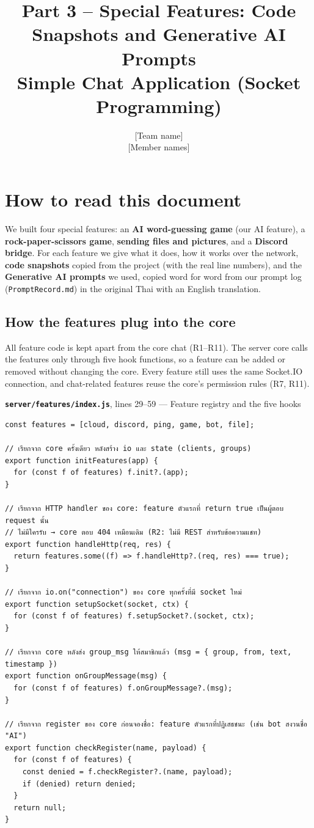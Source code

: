 \documentclass[11pt,a4paper]{article}
\title{\textbf{Part 3 -- Special Features: Code Snapshots and Generative AI Prompts}\\[2pt]
\large Simple Chat Application (Socket Programming)}
\author{{[Team name]} \\ {[Member names]}}
\date{}
\newcommand{\code}[1]{\texttt{#1}}
\newcommand{\snap}[3]{\par\medskip\textbf{\code{#1}}, lines #2 --- #3}
\begin{document}
\maketitle

\section*{How to read this document}
We built four special features: an \textbf{AI word-guessing game} (our AI feature), a
\textbf{rock-paper-scissors game}, \textbf{sending files and pictures}, and a \textbf{Discord bridge}.
For each feature we give what it does, how it works over the network, \textbf{code snapshots} copied
from the project (with the real line numbers), and the \textbf{Generative AI prompts} we used, copied
word for word from our prompt log (\code{PromptRecord.md}) in the original Thai with an English translation.

\subsection*{How the features plug into the core}
All feature code is kept apart from the core chat (R1--R11). The server core calls the features only
through five hook functions, so a feature can be added or removed without changing the core. Every
feature still uses the same Socket.IO connection, and chat-related features reuse the core's permission
rules (R7, R11).

\snap{server/features/index.js}{29--59}{Feature registry and the five hooks}
\begin{Verbatim}[firstnumber=29]
const features = [cloud, discord, ping, game, bot, file];

// เรียกจาก core ครั้งเดียว หลังสร้าง io และ state (clients, groups)
export function initFeatures(app) {
  for (const f of features) f.init?.(app);
}

// เรียกจาก HTTP handler ของ core: feature ตัวแรกที่ return true เป็นผู้ตอบ request นั้น
// ไม่มีใครรับ → core ตอบ 404 เหมือนเดิม (R2: ไม่มี REST สำหรับข้อความแชท)
export function handleHttp(req, res) {
  return features.some((f) => f.handleHttp?.(req, res) === true);
}

// เรียกจาก io.on("connection") ของ core ทุกครั้งที่มี socket ใหม่
export function setupSocket(socket, ctx) {
  for (const f of features) f.setupSocket?.(socket, ctx);
}

// เรียกจาก core หลังส่ง group_msg ให้สมาชิกแล้ว (msg = { group, from, text, timestamp })
export function onGroupMessage(msg) {
  for (const f of features) f.onGroupMessage?.(msg);
}

// เรียกจาก register ของ core ก่อนจองชื่อ: feature ตัวแรกที่ปฏิเสธชนะ (เช่น bot สงวนชื่อ "AI")
export function checkRegister(name, payload) {
  for (const f of features) {
    const denied = f.checkRegister?.(name, payload);
    if (denied) return denied;
  }
  return null;
}
\end{Verbatim}
\end{document}
